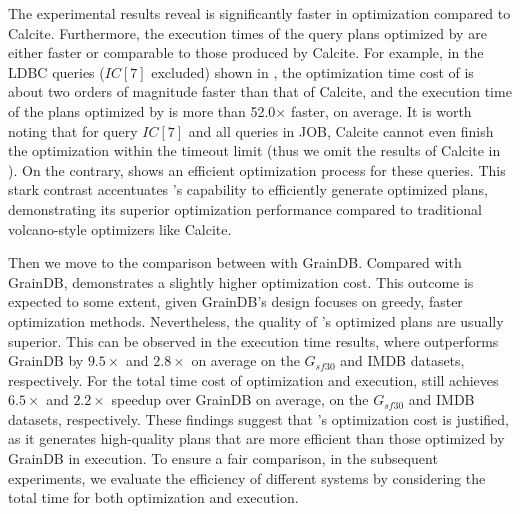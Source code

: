 The experimental results reveal \name is significantly faster in optimization compared to Calcite.
Furthermore, the execution times of the query plans optimized by \name are either faster or comparable to those produced by Calcite.
For example, in the LDBC queries ($IC[7]$ excluded) shown in , the optimization time cost of \name is about two orders of magnitude faster than that of Calcite, and the execution time of the plans optimized by \name is more than 52.0$\times$ faster, on average.
It is worth noting that for query $IC[7]$ and all queries in JOB, Calcite cannot even finish the optimization within the timeout limit (thus we omit the results of Calcite in ).
On the contrary, \name shows an efficient optimization process for these queries. 
This stark contrast accentuates \name's capability to efficiently generate optimized plans, demonstrating its superior optimization performance compared to traditional volcano-style optimizers like Calcite.

Then we move to the comparison between \name with GrainDB. Compared with GrainDB, \name demonstrates a slightly higher optimization cost. This outcome is expected to some extent, given GrainDB's design focuses on greedy, faster optimization methods.
Nevertheless, the quality of \name's optimized plans are usually superior. This can be observed in the execution time results, where \name outperforms GrainDB by $9.5\times$ and $2.8\times$ on average on the $G_{sf30}$ and IMDB datasets, respectively.
For the total time cost of optimization and execution, \name still achieves $6.5\times$ and $2.2\times$ speedup over GrainDB on average, on the $G_{sf30}$ and IMDB datasets, respectively.
These findings suggest that \name's optimization cost is justified, as it generates high-quality plans that are more efficient than those optimized by GrainDB in execution.
To ensure a fair comparison, in the subsequent experiments, we evaluate the efficiency of different systems by considering the total time for both optimization and execution.


